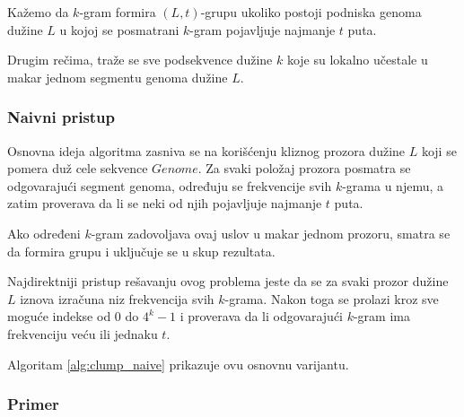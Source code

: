 \documentclass[12pt,oneside]{memoir}
\begin{document}
Kažemo da $k$-gram formira $(L,t)$-grupu ukoliko postoji podniska genoma dužine $L$ u kojoj se posmatrani $k$-gram pojavljuje najmanje $t$ puta.

Drugim rečima, traže se sve podsekvence dužine $k$ koje su lokalno učestale u makar jednom segmentu genoma dužine $L$.

\subsubsection{Naivni pristup}


Osnovna ideja algoritma zasniva se na korišćenju kliznog prozora dužine $L$ koji se pomera duž cele sekvence $Genome$. Za svaki položaj prozora posmatra se odgovarajući segment genoma, određuju se frekvencije svih $k$-grama u njemu, a zatim proverava da li se neki od njih pojavljuje najmanje $t$ puta.

Ako određeni $k$-gram zadovoljava ovaj uslov u makar jednom prozoru, smatra se da formira grupu i uključuje se u skup rezultata.


Najdirektniji pristup rešavanju ovog problema jeste da se za svaki prozor dužine $L$ iznova izračuna niz frekvencija svih $k$-grama. Nakon toga se prolazi kroz sve moguće indekse od $0$ do $4^k-1$ i proverava da li odgovarajući $k$-gram ima frekvenciju veću ili jednaku $t$.

Algoritam \ref{alg:clump_naive} prikazuje ovu osnovnu varijantu.

\begin{algorithm}[h]
\caption{Clump Finding}
\label{alg:clump_naive}
\SetAlgoLined
\DontPrintSemicolon
{}
\end{algorithm}

\subsubsection{Primer}
\end{document}
